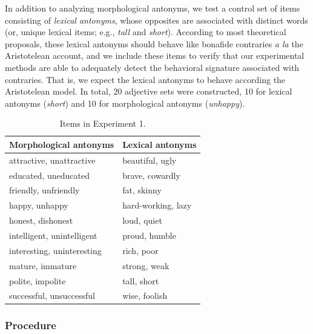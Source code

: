 \documentclass[floatsintext,doc]{apa6}
\begin{document}
In addition to analyzing morphological antonyms, we test a control set of items consisting of \emph{lexical antonyms}, whose opposites are associated with distinct words (or, unique lexical items; e.g., \emph{tall} and \emph{short}). 
According to most theoretical proposals, these lexical antonyms should behave like bonafide contraries \emph{a la} the Aristotelean account, and we include these items to verify that our experimental methods are able to adequately detect the behavioral signature associated with contraries. 
That is, we expect the lexical antonyms to behave according the Aristotelean model.
In total, 20 adjective sets were constructed, 10 for lexical antonyms (\emph{short}) and 10 for morphological antonyms (\emph{unhappy}). 

\begin{table}[h]
\centering
\begingroup\fontsize{10pt}{11pt}\selectfont
\begin{tabular}{ll}
  \hline
Morphological antonyms & Lexical antonyms \\ 
  \hline
attractive, unattractive & beautiful, ugly \\ 
  educated, uneducated & brave, cowardly \\ 
  friendly, unfriendly & fat, skinny \\ 
  happy, unhappy & hard-working, lazy \\ 
  honest, dishonest & loud, quiet \\ 
  intelligent, unintelligent & proud, humble \\ 
  interesting, uninteresting & rich, poor \\ 
  mature, immature & strong, weak \\ 
  polite, impolite & tall, short \\ 
  successful, unsuccessful & wise, foolish \\ 
   \hline
\end{tabular}
\endgroup
\caption{Items in Experiment 1.}
\label{tab:Items}
\end{table}


\subsubsection{Procedure}\label{procedure}
\end{document}
